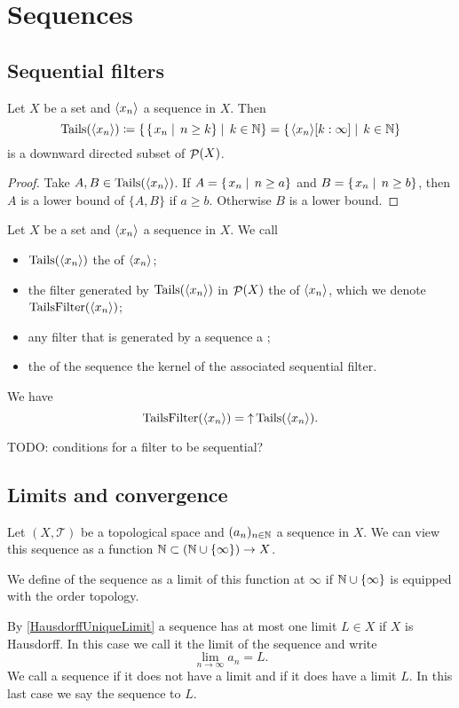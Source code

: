 \section{Sequences}
\subsection{Sequential filters}

\begin{lemma}
Let $X$ be a set and $\langle x_n \rangle$ a sequence in $X$. Then
\[ \operatorname{Tails}(\langle x_n \rangle) \coloneqq \left\{\left. \left\{\left. x_n \;\right|\; n \geq k \right\} \;\right|\; k\in \mathbb{N} \right\} = \left\{\left. \langle x_n \rangle[k:\infty] \;\right|\; k\in \mathbb{N} \right\} \]
is a downward directed subset of $\mathop{\mathcal{P}}(X)$.
\end{lemma}
\begin{proof}
Take $A,B\in \operatorname{Tails}(\langle x_n \rangle)$. If $A = \left\{\left. x_n \;\right|\; n \geq a \right\}$ and $B = \left\{\left. x_n \;\right|\; n \geq b \right\}$, then $A$ is a lower bound of $\{A,B\}$ if $a\geq b$. Otherwise $B$ is a lower bound.
\end{proof}

\begin{definition}
Let $X$ be a set and $\langle x_n \rangle$ a sequence in $X$. We call
\begin{itemize}
\item $\operatorname{Tails}(\langle x_n \rangle)$ the  of $\langle x_n \rangle$;
\item the filter generated by $\operatorname{Tails}(\langle x_n \rangle)$ in $\mathop{\mathcal{P}}(X)$ the  of $\langle x_n \rangle$, which we denote $\operatorname{TailsFilter}(\langle x_n \rangle)$;
\item any filter that is generated by a sequence a ;
\item the  of the sequence the kernel of the associated sequential filter.
\end{itemize}
We have 
\[ \operatorname{TailsFilter}(\langle x_n \rangle) = \mathop{\uparrow} \operatorname{Tails}(\langle x_n \rangle). \]
\end{definition}

TODO: conditions for a filter to be sequential?

\subsection{Limits and convergence}
\begin{definition}
Let $(X,\mathcal{T})$ be a topological space and $(a_n)_{n\in\mathbb{N}}$ a sequence in $X$. We can view this sequence as a function $\mathbb{N}\subset (\mathbb{N}\cup\{\infty\})\to X$.

We define  of the sequence as a limit of this function at $\infty$ if $\mathbb{N}\cup\{\infty\}$ is equipped with the order topology.
\end{definition}
By \ref{HausdorffUniqueLimit} a sequence has at most one limit $L\in X$ if $X$ is Hausdorff. In this case we call it the limit of the sequence and write
\[ \lim_{n\to \infty}a_n = L. \]
We call a sequence  if it does not have a limit and
  if it does have a limit $L$. In this last case we say the sequence  to $L$.

